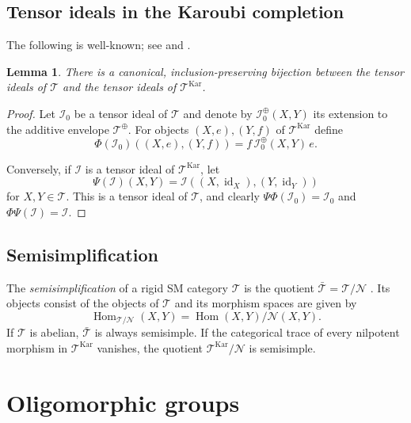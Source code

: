 \documentclass[11pt,a4paper]{amsart}
\theoremstyle{plain}%
\newtheorem{lemma}{Lemma}[subsection]
\theoremstyle{definition}
\theoremstyle{remark}
\newcommand{\Hom}{\operatorname{Hom}}
\newcommand{\id}{\operatorname{id}}
\newcommand{\Kar}{\mathrm{Kar}}
\begin{document}
\subsection{Tensor ideals in the Karoubi completion}

The following is well-known; see \cite[\S2.6.2]{Coulembier-ideals} and \cite[Lemme 1.3.10]{Andre-Kahn}.

\begin{lemma}\label{lem:ideals-kar}
There is a canonical, inclusion-preserving bijection between the tensor ideals of $\mathcal{T}$ and the tensor ideals of $\mathcal{T}^{\Kar}$.
\end{lemma}

\begin{proof}
Let $\mathcal{I}_0$ be a tensor ideal of $\mathcal{T}$ and denote by $\mathcal{I}_0^{\oplus}(X,Y)$ its extension to the additive envelope $\mathcal{T}^{\oplus}$. For objects $(X,e),(Y,f)$ of $\mathcal{T}^{\Kar}$ define
\[
\Phi(\mathcal{I}_0)((X,e),(Y,f))
   =f\,\mathcal{I}_0^{\oplus}(X,Y)\,e.
\]

Conversely, if $\mathcal{I}$ is a tensor ideal of $\mathcal{T}^{\Kar}$, let
\[
\Psi(\mathcal{I})(X,Y)
 =\mathcal{I}((X,\id_X),(Y,\id_Y))
\]
for $X,Y\in\mathcal{T}$. This is a tensor ideal of $\mathcal{T}$, and clearly $\Psi\Phi(\mathcal{I}_0)=\mathcal{I}_0$ and $\Phi\Psi(\mathcal{I})=\mathcal{I}$. 
\end{proof}

\subsection{Semisimplification} 

The \emph{semisimplification} of a rigid SM category $\mathcal{T}$ is the quotient $\bar{\mathcal{T}} = \mathcal{T}/\mathcal{N}$ \cite{Barrett-Westbury}. Its objects {consist} of the objects of $\mathcal{T}$ and its morphism spaces are given by \[ \Hom_{\mathcal{T}/\mathcal{N}}(X,Y) = \Hom(X,Y)/\mathcal{N}(X,Y).\] If $\mathcal{T}$ is abelian, $\bar{\mathcal{T}}$ is always semisimple. If the categorical trace of every nilpotent morphism in $\mathcal{T}^{\Kar}$ vanishes, the quotient $\mathcal{T}^{\Kar}/\mathcal{N}$ is semisimple.

\section{Oligomorphic groups}
\end{document}
